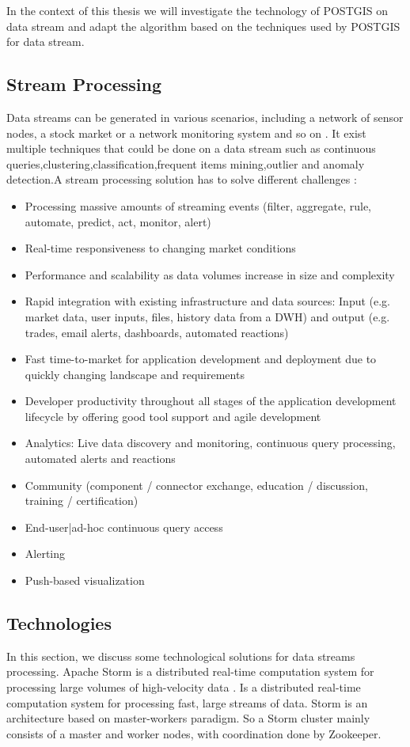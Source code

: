 \documentclass[twoside,12pt, a4paper]{report}
\begin{document}
In the context of this thesis we will investigate the technology of POSTGIS on data stream and adapt the algorithm based on the techniques used by POSTGIS for data stream. 

\subsection{Stream Processing}

Data streams can be generated in various scenarios,
including a network of sensor nodes, a stock market or a
network monitoring system and so on \cite{namiot2015big}. It exist multiple techniques that could be done on 
a data stream such as continuous queries,clustering,classification,frequent items mining,outlier and anomaly detection.A stream processing solution has to solve different
challenges \cite{Wähner_2014} :
\begin{itemize}
\item  Processing massive amounts of streaming events (filter, aggregate, rule, automate, predict, act, monitor, alert)
\item  Real-time responsiveness to changing market conditions
\item  Performance and scalability as data volumes increase in size and complexity
\item  Rapid integration with existing infrastructure and data sources: Input (e.g. market data, user inputs, files, history data from a DWH) and output (e.g. trades, email alerts, dashboards, automated reactions)
\item  Fast time-to-market for application development and deployment due to quickly changing landscape and requirements
\item  Developer productivity throughout all stages of the application development lifecycle by offering good tool support and agile development
\item  Analytics: Live data discovery and monitoring, continuous query processing, automated alerts and reactions
\item  Community (component / connector exchange, education / discussion, training / certification)
\item  End-user|ad-hoc continuous query access
\item  Alerting
\item  Push-based visualization
\end{itemize}

\subsection{Technologies}
In this section, we discuss some technological solutions for
data streams processing.
Apache Storm is a distributed real-time computation system
for processing large volumes of high-velocity data \cite{jain2014learning}. Is a
distributed real-time computation system for processing fast,
large streams of data. Storm is an architecture based on
master-workers paradigm. So a Storm cluster mainly
consists of a master and worker nodes, with coordination
done by Zookeeper.
\end{document}
